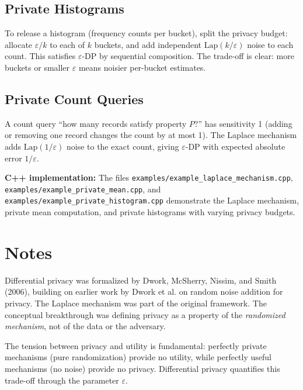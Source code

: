 \documentclass[twoside,12pt]{book}
\theoremstyle{plain}
\theoremstyle{definition}
\theoremstyle{remark}
\newenvironment{cpplisting}{\begin{center}\small}{\end{center}}
\begin{document}
\subsection{Private Histograms}

To release a histogram (frequency counts per bucket), split the privacy budget: allocate $\varepsilon/k$ to each of $k$ buckets, and add independent $\text{Lap}(k/\varepsilon)$ noise to each count. This satisfies $\varepsilon$-DP by sequential composition. The trade-off is clear: more buckets or smaller $\varepsilon$ means noisier per-bucket estimates.

\subsection{Private Count Queries}

A count query ``how many records satisfy property $P$?'' has sensitivity 1 (adding or removing one record changes the count by at most 1). The Laplace mechanism adds $\text{Lap}(1/\varepsilon)$ noise to the exact count, giving $\varepsilon$-DP with expected absolute error $1/\varepsilon$.

\begin{cpplisting}
\textbf{C++ implementation:} The files \texttt{examples/example\_laplace\_mechanism.cpp}, \texttt{examples/example\_private\_mean.cpp}, and \texttt{examples/example\_private\_histogram.cpp} demonstrate the Laplace mechanism, private mean computation, and private histograms with varying privacy budgets.
\end{cpplisting}

\section*{Notes}

Differential privacy was formalized by Dwork, McSherry, Nissim, and Smith (2006), building on earlier work by Dwork et al. on random noise addition for privacy. The Laplace mechanism was part of the original framework. The conceptual breakthrough was defining privacy as a property of the \emph{randomized mechanism}, not of the data or the adversary.

The tension between privacy and utility is fundamental: perfectly private mechanisms (pure randomization) provide no utility, while perfectly useful mechanisms (no noise) provide no privacy. Differential privacy quantifies this trade-off through the parameter $\varepsilon$.
\end{document}
